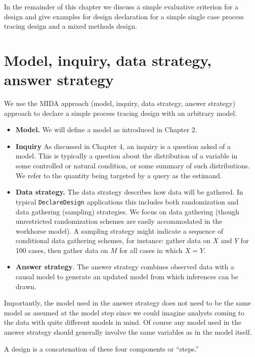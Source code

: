 \documentclass[12pt,]{book}
\begin{document}
In the remainder of this chapter we discuss a simple evaluative criterion for a design and give examples for design declaration for a simple single case process tracing design and a mixed methods design.

\hypertarget{model-inquiry-data-strategy-answer-strategy}{%
\section{Model, inquiry, data strategy, answer strategy}\label{model-inquiry-data-strategy-answer-strategy}}

We use the MIDA approach (model, inquiry, data strategy, answer strategy) approach to declare a simple process tracing design with an arbitrary model.

\begin{itemize}
\item
  \textbf{Model.} We will define a model as introduced in Chapter 2.
\item
  \textbf{Inquiry} As discussed in Chapter 4, an inquiry is a question asked of a model. This is typically a question about the distribution of a variable in some controlled or natural condition, or some summary of such distributions. We refer to the quantity being targeted by a query as the estimand.
\item
  \textbf{Data strategy.} The data strategy describes how data will be gathered. In typical \texttt{DeclareDesign} applications this includes both randomization and data gathering (sampling) strategies. We focus on data gathering (though unrestricted randomization schemes are easily accommodated in the workhorse model). A sampling strategy might indicate a sequence of conditional data gathering schemes, for instance: gather data on \(X\) and \(Y\) for 100 cases, then gather data on \(M\) for all cases in which \(X=Y\).
\item
  \textbf{Answer strategy}. The answer strategy combines observed data with a causal model to generate an updated model from which inferences can be drawn.
\end{itemize}

Importantly, the model used in the answer strategy does not need to be the same model as assumed at the model step since we could imagine analysts coming to the data with quite different models in mind. Of course any model used in the answer strategy should generally involve the same variables as in the model itself.

A design is a concatenation of these four components or ``steps.''
\end{document}
